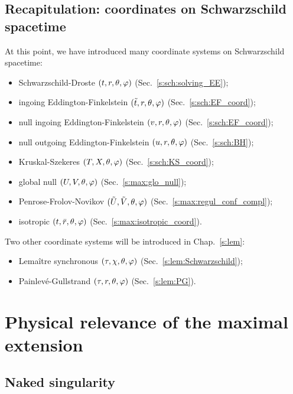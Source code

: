\subsection{Recapitulation: coordinates on Schwarzschild spacetime}

At this point, we have introduced many coordinate systems on Schwarzschild spacetime:
\begin{itemize}
\item Schwarzschild-Droste $(t,r,\theta,\varphi)$ (Sec.~\ref{s:sch:solving_EE});
\item ingoing Eddington-Finkelstein $(\tilde{t},r,\theta,\varphi)$ (Sec.~\ref{s:sch:EF_coord});
\item null ingoing Eddington-Finkelstein $(v,r,\theta,\varphi)$ (Sec.~\ref{s:sch:EF_coord});
\item null outgoing Eddington-Finkelstein $(u,r,\theta,\varphi)$ (Sec.~\ref{s:sch:BH});
\item Kruskal-Szekeres $(T,X,\theta,\varphi)$ (Sec.~\ref{s:sch:KS_coord});
\item global null $(U,V,\theta,\varphi)$ (Sec.~\ref{s:max:glo_null});
\item Penrose-Frolov-Novikov $(\tilde{U},\tilde{V},\theta,\varphi)$ (Sec.~\ref{s:max:regul_conf_compl});
\item isotropic $(t,\bar{r},\theta,\varphi)$ (Sec.~\ref{s:max:isotropic_coord}).
\end{itemize}
Two other coordinate systems will be introduced in Chap.~\ref{s:lem}:
\begin{itemize}
\item Lemaître synchronous $(\tau,\chi,\theta,\varphi)$ (Sec.~\ref{s:lem:Schwarzschild});
\item Painlevé-Gullstrand $(\tau,r,\theta,\varphi)$ (Sec.~\ref{s:lem:PG}).
\end{itemize}


\section{Physical relevance of the maximal extension} \label{s:max:relevance}

\subsection{Naked singularity} \label{s:max:naked_sing}

